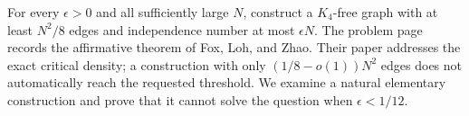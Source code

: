 For every $\epsilon>0$ and all sufficiently large $N$, construct a $K_4$-free graph with at least $N^2/8$ edges and independence number at most $\epsilon N$. The problem page records the affirmative theorem of Fox, Loh, and Zhao. Their paper addresses the exact critical density; a construction with only $(1/8-o(1))N^2$ edges does not automatically reach the requested threshold. We examine a natural elementary construction and prove that it cannot solve the question when $\epsilon<1/12$.
